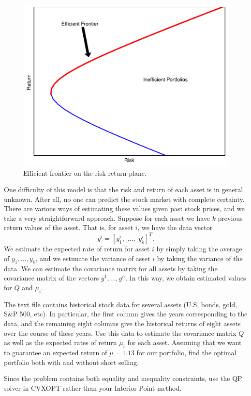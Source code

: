 \begin{figure}
\includegraphics[width=\textwidth]{frontier.pdf}
\caption{Efficient frontier on the risk-return plane.}
\label{fig:frontier}
\end{figure}

One difficulty of this model is that the risk and return of each asset is in general unknown. After all, no one can predict the stock
market with complete certainty. There are various ways of estimating these values given past stock prices, and we take a very straightforward
approach. Suppose for each asset we have $k$ previous return values of the asset. That is, for asset $i$, we have the data vector
\[
y^i = [y^i_1,\,\, \ldots, \,\,y^i_k]^T.
\]
We estimate the expected rate of return for asset $i$ by simply taking the average of $y_1,\ldots,y_k$, and we estimate the variance
of asset $i$ by taking the variance of the data. We can estimate the covariance matrix for all assets by taking the covariance matrix of the
vectors $y^1,\ldots,y^n$. In this way, we obtain estimated values for $Q$ and $\mu_i$.

\begin{problem}
The text file  contains historical stock data for several assets (U.S. bonds, gold, S\&P 500, etc).
In particular, the first column gives the years corresponding to the data, and the remaining eight columns give the historical returns
of eight assets over the course of these years. Use this data to estimate the covariance matrix $Q$ as well as the expected rates
of return $\mu_i$ for each asset. Assuming that we want to guarantee an expected return of $\mu = 1.13$ for our portfolio,
find the optimal portfolio both with and without short selling.

Since the problem contains both equality and inequality constraints, use the QP solver in CVXOPT rather than your Interior Point method.

\end{problem} 